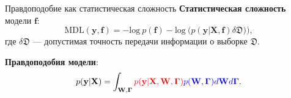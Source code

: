 \documentclass[usenames,dvipsnames,11pt,pdf,utf8,russian,aspectratio=169]{beamer}
\begin{document}
\begin{frame}{Правдоподобие как статистическая сложность}  
\small
\textbf{Статистическая сложность} модели $\mathbf{f}$:
\[
	\text{MDL}(\mathbf{y},\mathbf{f}) = -\text{log}~p(\mathbf{f}) - \text{log}~\bigl(p(\mathbf{y}|\mathbf{X}, \mathbf{f})\delta\mathfrak{D})\bigr),
\]
где $\delta\mathfrak{D}$ --- допустимая точность передачи информации о выборке $\mathfrak{D}$.

\textbf{Правдоподобия модели}:                                      
\[                                                                                                                                              
        p(\mathbf{y}|\mathbf{X}) = \int_{\mathbf{W}, \boldsymbol{\Gamma} } \textcolor{red}{p(\mathbf{y}|\mathbf{X},\mathbf{W},  \boldsymbol{\Gamma})} \textcolor{blue}{p(\mathbf{W}, \boldsymbol{\Gamma}) d\mathbf{W}d{\boldsymbol{\Gamma}}}.                         
\]       


\begin{figure}
\vspace{-0.5cm}
  \centering

\end{figure}
\end{frame}
\end{document}
